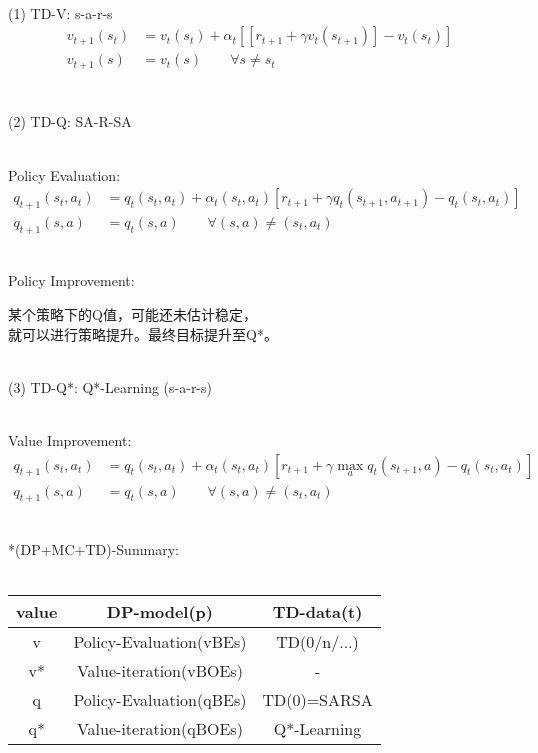 \documentclass{article}
\begin{document}
\newpage


~ \\[3pt]
(1) TD-V: \qquad s-a-r-s 
\begin{align*}
    v_{t+1} (s_{t}) &= v_{t} (s_{t}) + \alpha_{t} 
        [ [ r_{t+1} + \gamma v_{t} (s_{t+1}) ] - v_{t} (s_{t}) ] \\[3pt]
    v_{t+1} (s)     &= v_{t} (s) 
    \qquad \forall s \neq s_{t} \\[3pt]
\end{align*}


~ \\[3pt]
(2) TD-Q: \qquad SA-R-SA 

~ \\[3pt]
Policy Evaluation: 
\begin{align*}
    q_{t+1} (s_{t}, a_{t}) 
        &= q_{t} (s_{t}, a_{t}) + \alpha_{t} (s_{t}, a_{t}) 
        [ r_{t+1} + \gamma q_{t} (s_{t+1}, a_{t+1}) 
        - q_{t} (s_{t}, a_{t}) ] \\[3pt]
    q_{t+1} (s, a) &= q_{t} (s, a) 
    \qquad \forall (s, a) \neq (s_{t}, a_{t}) 
\end{align*}

~ \\[3pt]
Policy Improvement: \\[3pt]
\begin{CJK}{UTF8}{gbsn}
    某个策略下的Q值，可能还未估计稳定， \\[3pt]
    就可以进行策略提升。最终目标提升至Q*。 \\[3pt]
\end{CJK}


~ \\[3pt]
(3) TD-Q*: \qquad Q*-Learning \quad (s-a-r-s) 

~ \\[3pt]
Value Improvement: 
\begin{align*}
    q_{t+1} (s_{t}, a_{t}) 
        &= q_{t} (s_{t}, a_{t}) + \alpha_{t} (s_{t}, a_{t}) 
        [ r_{t+1} + \gamma \max_{a} q_{t} (s_{t+1}, a) 
        - q_{t} (s_{t}, a_{t}) ] \\[3pt]
    q_{t+1} (s, a) &= q_{t} (s, a) 
    \qquad \forall (s, a) \neq (s_{t}, a_{t}) 
\end{align*}


~ \\[48pt]
\centering
*(DP+MC+TD)-Summary: \\[3pt]
~ \\[3pt]
\begin{tabular}{ccc}  %

    \toprule 
        value & DP-model(p)                 & TD-data(t)  \\[3pt]
    \midrule 
        v     & Policy-Evaluation(vBEs)     & TD(0/n/...) \\[3pt]
        v*    & Value-iteration(vBOEs)      & -           \\[3pt]
        q     & Policy-Evaluation(qBEs)     & TD(0)=SARSA \\[3pt]
        q*    & Value-iteration(qBOEs)      & Q*-Learning \\[3pt]
    \bottomrule 

\end{tabular}
\flushleft
\end{document}
